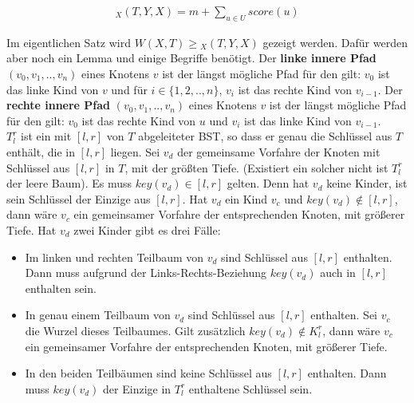 \documentclass[a4paper,12pt]{article}
\begin{document}
\begin{align*}
_X(T, Y, X)  = m + \sum_{u \in U} {\mathit{score}} \left(u\right)
\end{align*} 

\noindent Im eigentlichen Satz wird $\mathit{W\left(X, T\right)} \geq {_X(T, Y, X)} $ gezeigt werden. Dafür werden aber noch ein Lemma und einige Begriffe benötigt. Der \textbf{linke innere Pfad} $\left(v_0,v_1,..,v_n \right)$ eines Knotens $v$ ist der längst mögliche Pfad für den gilt: $v_0$ ist das linke Kind von $v$ und für $i \in \{1, 2,..,n\}$, $v_i$ ist das rechte Kind von $v_{i-1}$. Der \textbf{rechte innere Pfad} $\left(v_0,v_1,..,v_n \right)$ eines Knotens $v$ ist der längst mögliche Pfad für den gilt: $v_0$ ist das rechte Kind von $u$ und $v_i$ ist das linke Kind von $v_{i-1}$.\\ $T^r_l$ ist ein mit $\left[l,r\right]$ von $T$ abgeleiteter BST, so dass er genau die Schlüssel aus $T$ enthält, die in $\left[l, r\right]$ liegen. Sei $v_d$ der gemeinsame Vorfahre der Knoten mit Schlüssel aus  $\left[l,r\right]$ in $T$, mit der größten Tiefe. (Existiert ein solcher nicht ist $T^r_l$ der leere Baum). Es muss $\mathit{key}(v_d) \in \left[l,r\right]$ gelten. Denn hat $v_d$ keine Kinder, ist sein Schlüssel der Einzige aus $\left[l,r\right]$. Hat $v_d$ ein Kind $v_{c}$ und $\mathit{key}(v_d) \notin \left[l,r\right]$, dann wäre $v_{c}$ ein gemeinsamer Vorfahre der entsprechenden Knoten, mit größerer Tiefe. Hat $v_d$ zwei Kinder gibt es drei Fälle:
\begin{itemize}
	\item Im linken und rechten Teilbaum von $v_d$ sind Schlüssel aus $\left[l,r\right]$ enthalten. Dann muss aufgrund der Links-Rechts-Beziehung  $\mathit{key}(v_d)$ auch in $\left[l,r\right]$ enthalten sein.
	\item In genau einem Teilbaum von $v_d$ sind Schlüssel aus $\left[l,r\right]$ enthalten. Sei $v_{c}$ die Wurzel dieses Teilbaumes. Gilt zusätzlich $\mathit{key}(v_d) \notin K^r_l$, dann wäre $v_c$ ein  gemeinsamer Vorfahre der entsprechenden Knoten, mit größerer Tiefe.
	\item In den beiden Teilbäumen sind keine Schlüssel aus $\left[l,r\right]$ enthalten.  Dann muss $\mathit{key}(v_d)$ der Einzige in $T^r_l$ enthaltene Schlüssel sein.
\end{itemize}
\end{document}
